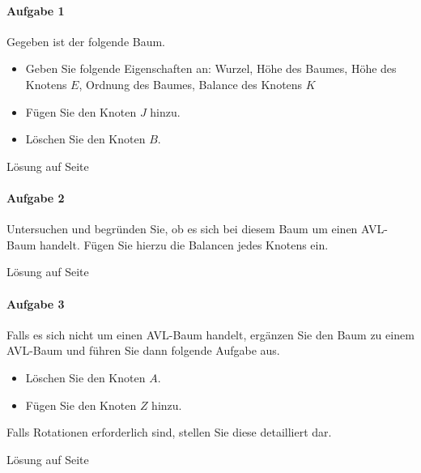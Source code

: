 \documentclass[11pt,a4paper]{scrartcl}
\begin{document}
\paragraph{Aufgabe 1} Gegeben ist der folgende Baum.
\begin{itemize}
\item Geben Sie folgende Eigenschaften an: Wurzel, Höhe des Baumes, Höhe des Knotens $E$, Ordnung des Baumes, Balance des Knotens $K$
\item Fügen Sie den Knoten $J$ hinzu.
\item Löschen Sie den Knoten $B$.
\end{itemize}
\begin{figure}[h]
\centering
{}
\end{figure}
\begin{flushright}
Lösung auf Seite \pageref{a4.1:lsg} \\
\end{flushright}
\paragraph{Aufgabe 2} 
Untersuchen und begründen Sie, ob es sich bei diesem Baum um einen AVL-Baum handelt. Fügen Sie hierzu die Balancen jedes Knotens ein. 
\begin{flushright}
Lösung auf Seite \pageref{a4.2:lsg}
\end{flushright}
\paragraph{Aufgabe 3}
Falls es sich nicht um einen AVL-Baum handelt, ergänzen Sie den Baum zu einem AVL-Baum und führen Sie dann folgende Aufgabe aus.
\begin{itemize}
\item Löschen Sie den Knoten $A$.
\item Fügen Sie den Knoten $Z$ hinzu. 
\end{itemize}
Falls Rotationen erforderlich sind, stellen Sie diese detailliert dar. 
\begin{flushright}
Lösung auf Seite \pageref{a4.3:lsg}
\end{flushright}
\end{document}
